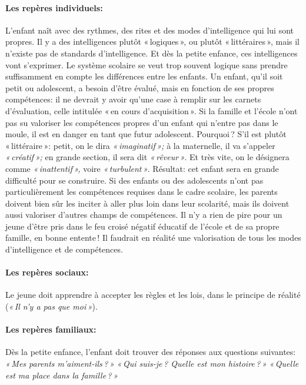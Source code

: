 \documentclass[11pt]{article} %
\begin{document}
  \paragraph{Les repères individuels:}  L'enfant naît avec des rythmes, des rites et des modes d'intelligence qui lui sont propres. Il y a des intelligences plutôt « logiques », ou plutôt « littéraires », mais il n'existe pas de standards d'intelligence. Et dès la petite enfance, ces intelligences vont s'exprimer.\newline
  Le système scolaire se veut trop souvent logique sans prendre suffisamment en compte les différences entre les enfants. Un enfant, qu'il soit petit ou adolescent, a besoin d'être évalué, mais en fonction de ses propres compétences: il ne devrait y avoir qu'une case à remplir sur les carnets d'évaluation, celle intitulée « en cours d'acquisition ». Si la famille et l'école n'ont pas su valoriser les compétences propres d'un enfant qui n'entre pas dans le moule, il est en danger en tant que futur adolescent. Pourquoi ? S'il est plutôt « littéraire »: petit, on le dira \textit{« imaginatif »; }à la maternelle, il va s'appeler \textit{« créatif »; }en grande section, il sera dit \textit{« rêveur »}. Et très vite, on le désignera comme \textit{« inattentif », }voire \textit{« turbulent »}. Résultat: cet enfant sera en grande difficulté pour se construire.\newline
  Si des enfants ou des adolescents n'ont pas particulièrement les compétences requises dans le cadre scolaire, les parents doivent bien sûr les inciter à aller plus loin dans leur scolarité, mais ils doivent aussi valoriser d'autres champs de compétences. Il n'y a rien de pire pour un jeune d'être pris dans le feu croisé négatif éducatif de l'école et de sa propre famille, en bonne entente ! Il faudrait en réalité une valorisation de tous les modes d'intelligence et de compétences.

  \paragraph{Les repères sociaux:}  Le jeune doit apprendre à accepter les règles et les lois, dans le principe de réalité (\textit{« Il n'y a pas que moi »}).

  \paragraph{Les repères familiaux:}  Dès la petite enfance, l'enfant doit trouver des réponses aux questions suivantes:\newline
  \textit{« Mes parents m'aiment-ils ? »} \newline
  \textit{« Qui suis-je ? Quelle est mon histoire ? »} \newline
  \textit{« Quelle est ma place dans la famille ? »}
\end{document}
